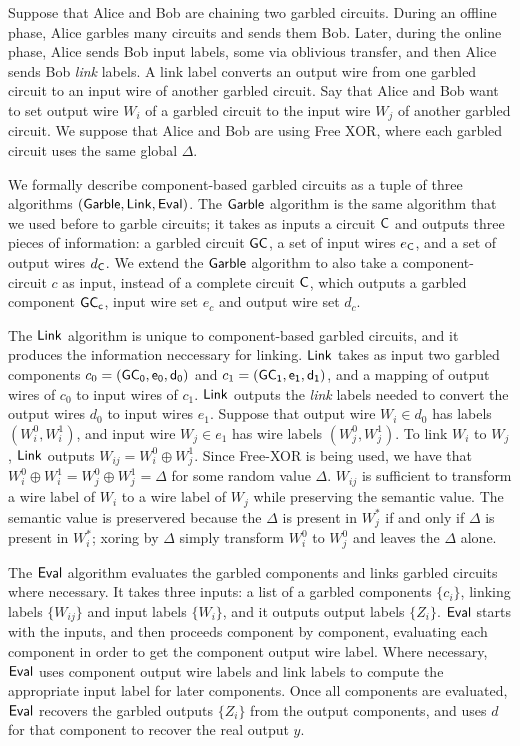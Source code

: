 Suppose that Alice and Bob are chaining two garbled circuits.
During an offline phase, Alice garbles many circuits and sends them Bob.
Later, during the online phase, Alice sends Bob input labels, some via oblivious transfer, and then Alice sends Bob \textit{link} labels.
A link label converts an output wire from one garbled circuit to an input wire of another garbled circuit.
Say that Alice and Bob want to set output wire $W_i$ of a garbled circuit to the input wire $W_j$ of another garbled circuit.
We suppose that Alice and Bob are using Free XOR, where each garbled circuit uses the same global $\Delta$.

We formally describe component-based garbled circuits as a tuple of three algorithms $(\sf{Garble}, \sf{Link}, \sf{Eval})$.
The $\sf{Garble}$ algorithm is the same algorithm that we used before to garble circuits; it takes as inputs a circuit $\sf {C}$ and outputs three pieces of information: a garbled circuit $\sf {GC}$, a set of input wires $e_{\sf {C}}$, and a set of output wires $d_{\sf {C}}$.
We extend the $\sf{Garble}$ algorithm to also take a component-circuit $c$ as input, instead of a complete circuit $\sf {C}$, which outputs a garbled component $\sf {GC}_c$, input wire set $e_c$ and output wire set $d_c$. 

The $\sf{Link}$ algorithm is unique to component-based garbled circuits, and it produces the information neccessary for linking.
$\sf{Link}$ takes as input two garbled components $c_0 = (\sf {GC}_0, e_0, d_0)$ and $c_1 = (\sf {GC}_1, e_1, d_1)$, and a mapping of output wires of $c_0$ to input wires of $c_1$. 
$\sf{Link}$ outputs the \textit{link} labels needed to convert the output wires $d_0$ to input wires $e_1$. 
Suppose that output wire $W_i \in d_0$ has labels $(W_i^0, W_i^1)$, and input wire $W_j \in e_1$ has wire labels $(W_j^0, W_j^1)$.
To link $W_i$ to $W_j$, $\sf{Link}$ outputs $W_{ij} = W_i^0 \oplus W_j^1$. 
Since Free-XOR is being used, we have that $W_i^0 \oplus W_i^1 = W_j^0 \oplus W_j^1 = \Delta$ for some random value $\Delta$.
$W_{ij}$ is sufficient to transform a wire label of $W_i$ to a wire label of $W_j$ while preserving the semantic value. 
The semantic value is preservered because the $\Delta$ is present in $W_j^*$ if and only if $\Delta$ is present in $W_i^*$; xoring by $\Delta$ simply transform $W_i^0$ to $W_j^0$ and leaves the $\Delta$ alone.

The $\sf{Eval}$ algorithm evaluates the garbled components and links garbled circuits where necessary.
It takes three inputs: a list of a garbled components $\{c_i\}$, linking labels $\{W_{ij}\}$ and input labels $\{W_i\}$, and it outputs output labels $\{Z_i\}$. 
$\sf{Eval}$ starts with the inputs, and then proceeds component by component, evaluating each component in order to get the component output wire label.
Where necessary, $\sf{Eval}$ uses component output wire labels and link labels to compute the appropriate input label for later components. 
Once all components are evaluated, $\sf{Eval}$ recovers the garbled outputs $\{Z_i\}$ from the output components, and uses $d$ for that component to recover the real output $y$. 

